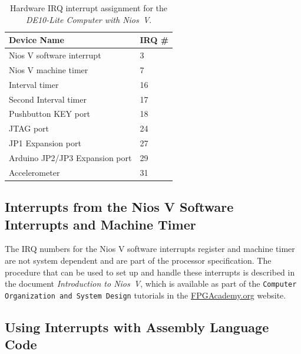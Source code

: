 \documentclass[11pt, twoside, pdftex]{article}
\newcommand{\commonFiles}{../../../common/doc}
\newcommand{\systemNameFull}{DE10-Lite Computer with Nios~V}
\newcommand{\processor}{Nios~V}
\begin{document}
\begin{table}[h]
    \begin{center}
    \begin{tabular}{l|l}
            \textbf{Device Name} &
            \textbf{IRQ \#}
        \\\hline
            Nios V software interrupt & 3 \\
            Nios V machine timer & 7 \\
            Interval timer & 16 \\
            Second Interval timer & 17 \\
            Pushbutton KEY port & 18 \\
            JTAG port & 24 \\
            JP1 Expansion port & 27 \\
            Arduino JP2/JP3 Expansion port & 29 \\
            Accelerometer & 31 \\
    \end{tabular}
    \caption{Hardware IRQ interrupt assignment for the {\it \systemNameFull}.}
	 \label{tab:irq}
    \end{center}
\end{table}

\subsection{Interrupts from the Nios V Software Interrupts and Machine Timer}
The IRQ numbers for the Nios V software interrupts register and machine timer are not
system dependent and are part of the processor specification. The procedure that can be used
to set up and handle these interrupts is described in the 
document {\it Introduction to \processor}, which is available as part of the 
\texttt{Computer Organization and System Design} tutorials in the 
{\small \href{https://www.fpgacademy.org/tutorials.html} {FPGAcademy.org}} website.






\subsection{Using Interrupts with Assembly Language Code}
\end{document}
